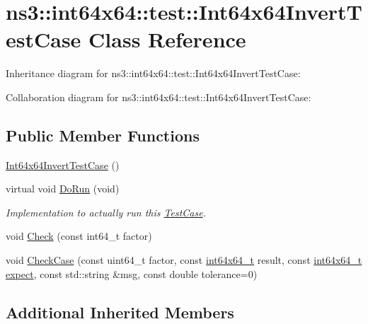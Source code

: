 \hypertarget{classns3_1_1int64x64_1_1test_1_1Int64x64InvertTestCase}{}\section{ns3\+:\+:int64x64\+:\+:test\+:\+:Int64x64\+Invert\+Test\+Case Class Reference}
\label{classns3_1_1int64x64_1_1test_1_1Int64x64InvertTestCase}


Inheritance diagram for ns3\+:\+:int64x64\+:\+:test\+:\+:Int64x64\+Invert\+Test\+Case\+:


Collaboration diagram for ns3\+:\+:int64x64\+:\+:test\+:\+:Int64x64\+Invert\+Test\+Case\+:
\subsection*{Public Member Functions}
\begin{DoxyCompactItemize}
\item 
\hyperlink{classns3_1_1int64x64_1_1test_1_1Int64x64InvertTestCase_af0b6bf0fd98649ca8da8cb9d2b4451bb}{Int64x64\+Invert\+Test\+Case} ()
\item 
virtual void \hyperlink{classns3_1_1int64x64_1_1test_1_1Int64x64InvertTestCase_a57168b2bc7cf7946c6d45fb5ebd597a9}{Do\+Run} (void)
\begin{DoxyCompactList}\small\item\em Implementation to actually run this \hyperlink{classns3_1_1TestCase}{Test\+Case}. \end{DoxyCompactList}\item 
void \hyperlink{classns3_1_1int64x64_1_1test_1_1Int64x64InvertTestCase_ae32039c08b1c09f57e3c3f428ca180fb}{Check} (const int64\+\_\+t factor)
\item 
void \hyperlink{classns3_1_1int64x64_1_1test_1_1Int64x64InvertTestCase_a098f4f701e9c430489ef2c9fa59eb843}{Check\+Case} (const uint64\+\_\+t factor, const \hyperlink{classint64x64__t}{int64x64\+\_\+t} result, const \hyperlink{classint64x64__t}{int64x64\+\_\+t} \hyperlink{doc_2readme_8txt_a11460adc33d00ccf94a559cdd45990ea}{expect}, const std\+::string \&msg, const double tolerance=0)
\end{DoxyCompactItemize}
\subsection*{Additional Inherited Members}


